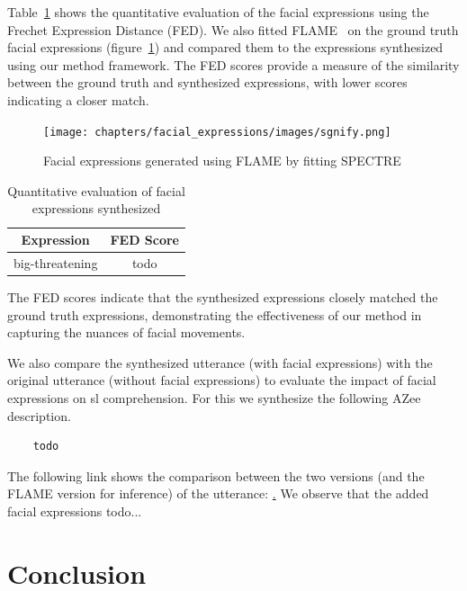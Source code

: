 \documentclass[../../main]{subfiles}
\begin{document}
Table~\ref{tab:facial_expressions_quantitative} shows the quantitative evaluation of the facial expressions using the Frechet Expression Distance (FED). We also fitted FLAME~\cite{FLAME} on the ground truth facial expressions (figure~\ref{ch:facial_expressions:fig:spectre}) and compared them to the expressions synthesized using our method framework. The FED scores provide a measure of the similarity between the ground truth and synthesized expressions, with lower scores indicating a closer match.

\begin{figure}
    \centering
    \texttt{[image: chapters/facial\_expressions/images/sgnify.png]}
    \caption{Facial expressions generated using FLAME by fitting SPECTRE}
    \label{ch:facial_expressions:fig:spectre}
\end{figure}

\begin{table}
    \centering
    \begin{tabular}{|c|c|}
        \hline
        \textbf{Expression} & \textbf{FED Score} \\
        \hline
        big-threatening & todo \\
        \hline
    \end{tabular}
    \caption{Quantitative evaluation of facial expressions synthesized}
    \label{tab:facial_expressions_quantitative}
\end{table}

The FED scores indicate that the synthesized expressions closely matched the ground truth expressions, demonstrating the effectiveness of our method in capturing the nuances of facial movements.

We also compare the synthesized utterance (with facial expressions) with the original utterance (without facial expressions) to evaluate the impact of facial expressions on \gls{sl} comprehension. For this we synthesize the following AZee description.

\begin{verbatim}    
    todo
\end{verbatim}

The following link shows the comparison between the two versions (and the FLAME version for inference) of the utterance: \href{todo}. We observe that the added facial expressions todo...

\section{Conclusion}
\label{ch:facial_expressions:conclusion}
\end{document}

